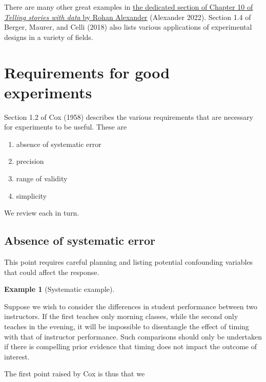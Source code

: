 \documentclass[
  11pt,
  letterpaper,
]{scrbook}
\providecommand{\tightlist}{%
  \setlength{\itemsep}{0pt}\setlength{\parskip}{0pt}}\usepackage{longtable,booktabs,array}
\theoremstyle{definition}
\theoremstyle{definition}
\newtheorem{example}{Example}[chapter]
\theoremstyle{remark}
\begin{document}
There are many other great examples in
\href{https://tellingstorieswithdata.com/08-hunt.html\#rct-examples}{the
dedicated section of Chapter 10 of \emph{Telling stories with data} by
Rohan Alexander} (Alexander 2022). Section 1.4 of Berger, Maurer, and
Celli (2018) also lists various applications of experimental designs in
a variety of fields.

\section{Requirements for good
experiments}\label{requirements-for-good-experiments}

Section 1.2 of Cox (1958) describes the various requirements that are
necessary for experiments to be useful. These are

\begin{enumerate}
\def\labelenumi{\arabic{enumi}.}
\tightlist
\item
  absence of systematic error
\item
  precision
\item
  range of validity
\item
  simplicity
\end{enumerate}

We review each in turn.

\subsection{Absence of systematic
error}\label{absence-of-systematic-error}

This point requires careful planning and listing potential confounding
variables that could affect the response.

\begin{example}[Systematic
example]\protect\hypertarget{exm-systematicerror}{}\label{exm-systematicerror}

Suppose we wish to consider the differences in student performance
between two instructors. If the first teaches only morning classes,
while the second only teaches in the evening, it will be impossible to
disentangle the effect of timing with that of instructor performance.
Such comparisons should only be undertaken if there is compelling prior
evidence that timing does not impact the outcome of interest.

\end{example}

The first point raised by Cox is thus that we
\end{document}
